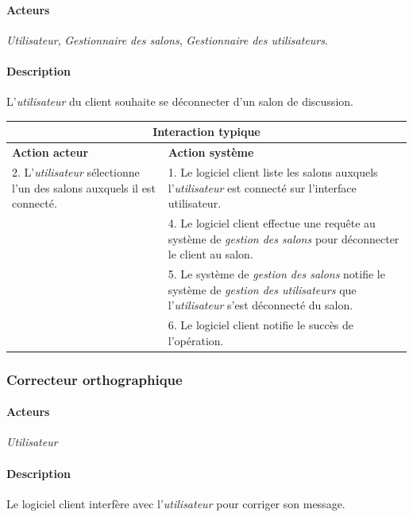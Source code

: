 \documentclass[a4paper]{article}
\begin{document}
    \paragraph{Acteurs} \textit{Utilisateur}, \textit{Gestionnaire des salons},
    \textit{Gestionnaire des utilisateurs}.

    \paragraph{Description} L'\textit{utilisateur} du client souhaite se
    déconnecter d'un salon de discussion.

    \begin{center}
        \begin{tabular}{|p{6cm}|p{6cm}|}
            \hline
            \multicolumn{2}{|c|}{\textbf{Interaction typique}} \\ \hline
            \textbf{Action acteur} & \textbf{Action système} \\ \hline
            2. L'\textit{utilisateur} sélectionne l'un des salons auxquels il
            est connecté. &
            1. Le logiciel client liste les salons auxquels 
            l'\textit{utilisateur} est connecté sur l'interface utilisateur. \\
            & 4. Le logiciel client effectue une requête au système de
            \textit{gestion des salons} pour déconnecter le client au salon. \\
            & 5. Le système de \textit{gestion des salons} notifie le système de
            \textit{gestion des utilisateurs} que l'\textit{utilisateur} s'est
            déconnecté du salon. \\
            & 6. Le logiciel client notifie le succès de l'opération. \\
            \hline
        \end{tabular}
    \end{center}

   \subsubsection{Correcteur orthographique}
    \label{ortho}

    \paragraph{Acteurs} \textit{Utilisateur}

    \paragraph{Description} Le logiciel client interfère avec 
    l'\textit{utilisateur} pour corriger son message.
\end{document}

